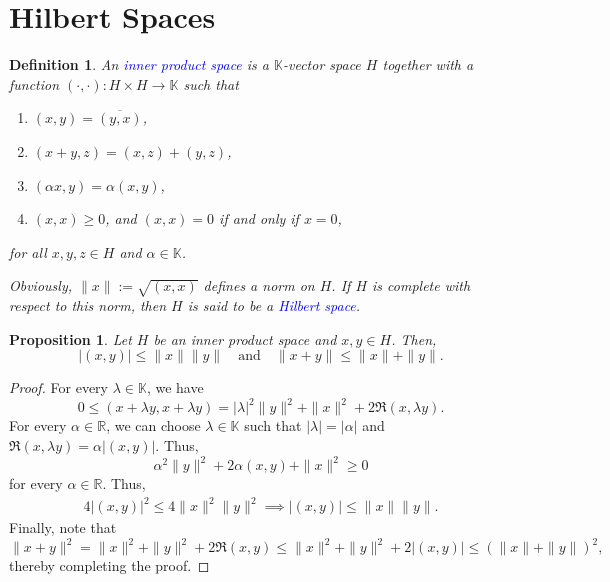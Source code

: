 \documentclass[12pt]{article}
\theoremstyle{thmstyle}
\newtheorem{proposition}[theorem]{Proposition}
\theoremstyle{defstyle}
\newtheorem{definition}[theorem]{Definition}
\newcommand{\R}{\mathbb{R}}
\newcommand{\bbC}{\mathbb{C}}
\newcommand{\K}{\mathbb{K}} %
\newcommand{\define}[1]{\textcolor{blue}{\textit{#1}}}
\renewcommand{\le}{\leqslant}
\renewcommand{\ge}{\geqslant}
\begin{document}
\section{Hilbert Spaces}

\begin{definition}
    An \define{inner product space} is a $\K$-vector space $H$ together with a function $(\cdot, \cdot): H\times H\to \K$ such that 
    \begin{enumerate}[label=(\roman*)]
        \item $(x, y) = \overline{(y, x)}$, 
        \item $(x + y, z) = (x, z) + (y, z)$, 
        \item $(\alpha x, y) = \alpha(x, y)$, 
        \item $(x, x)\ge 0$, and $(x, x) = 0$ if and only if $x = 0$,
    \end{enumerate}
    for all $x,y, z\in H$ and $\alpha\in\K$.

    Obviously, $\|x\|:= \sqrt{(x, x)}$ defines a norm on $H$. If $H$ is complete with respect to this norm, then $H$ is said to be a \define{Hilbert space}.
\end{definition}

\begin{proposition}
    Let $H$ be an inner product space and $x,y\in H$. Then, 
    \begin{equation*}
        |(x, y)|\le\|x\|\|y\|\quad\text{and}\quad\|x + y\|\le\|x\| + \|y\|.
    \end{equation*}
\end{proposition}
\begin{proof}
    For every $\lambda\in\K$, we have 
    \begin{equation*}
        0\le(x + \lambda y, x + \lambda y) = |\lambda|^2\|y\|^2 + \|x\|^2 + 2\Re(x,\lambda y).
    \end{equation*}
    For every $\alpha\in\R$, we can choose $\lambda\in\K$ such that $|\lambda| = |\alpha|$ and $\Re(x, \lambda y) = \alpha |(x,y)|$. Thus, 
    \begin{equation*}
        \alpha^2\|y\|^2 + 2\alpha(x, y) + \|x\|^2\ge 0
    \end{equation*}
    for every $\alpha\in\R$. Thus, 
    \begin{align}
        4|(x, y)|^2\le 4\|x\|^2\|y\|^2\implies |(x, y)|\le\|x\|\|y\|.
    \end{align}
    Finally, note that 
    \begin{equation*}
        \|x + y\|^2 = \|x\|^2 + \|y\|^2 + 2\Re(x, y)\le \|x\|^2 + \|y\|^2 + 2|(x, y)|\le  (\|x\| + \|y\|)^2,
    \end{equation*}
    thereby completing the proof.
\end{proof}
\end{document}
